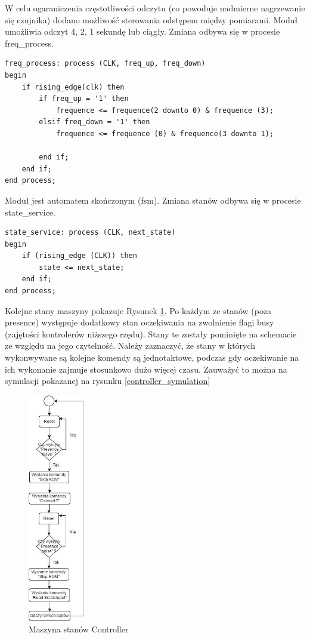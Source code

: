 \documentclass[a4paper]{article}
\begin{document}
W celu ogaraniczenia częstotliwości odczytu (co powoduje nadmierne nagrzewanie się czujnika) dodano możliwość sterowania odstępem między pomiarami. Moduł umożliwia odczyt 4, 2, 1 sekundę lub ciągły. Zmiana odbywa się w procesie freq\_process.

\lstset{language=VHDL}
\begin{lstlisting}[frame=single]
freq_process: process (CLK, freq_up, freq_down)
begin
	if rising_edge(clk) then
		if freq_up = '1' then
			frequence <= frequence(2 downto 0) & frequence (3);
		elsif freq_down = '1' then
			frequence <= frequence (0) & frequence(3 downto 1);

		end if;
	end if;
end process;
\end{lstlisting}

Moduł jest automatem skończonym (fsm). Zmiana stanów odbywa się w procesie  state\_service.

\lstset{language=VHDL}
\begin{lstlisting}[frame=single]
state_service: process (CLK, next_state)
begin
	if (rising_edge (CLK)) then
		state <= next_state;
	end if;
end process;
\end{lstlisting}

Kolejne stany maszyny pokazuje Rysunek \ref{controller_fsm}. Po każdym ze stanów (poza presence) występuje dodatkowy stan oczekiwania na zwolnienie flagi busy (zajętości kontrolerów niższego rzędu). Stany te zostały pominięte na schemacie ze względu na jego czytelność. Należy zaznaczyć, że stany w których wykonwywane są kolejne komendy są jednotaktowe, podczas gdy oczekiwanie na ich wykonanie zajmuje stosunkowo dużo więcej czasu. Zauważyć to można na symulacji pokazanej na rysunku \ref{controller_symulation}

\begin{figure}[H]
\begin{center}
\includegraphics[height=10cm]{graphics/controller_fsm.png}
\end{center}
\caption{Maszyna stanów Controller}
\label{controller_fsm}
\end{figure}
\end{document}
